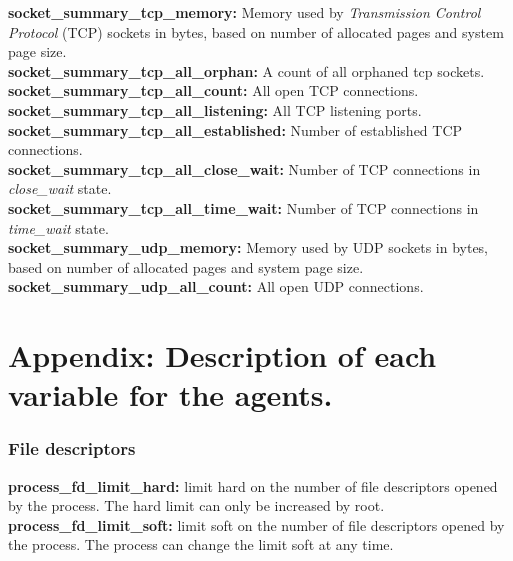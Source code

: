 \documentclass{iosart2c}
\begin{document}
\textbf{socket\_summary\_tcp\_memory:} Memory used by  \textit{Transmission Control Protocol} (TCP) sockets in bytes, based on number of allocated pages and system page size. \\

\textbf{socket\_summary\_tcp\_all\_orphan:} A count of all orphaned tcp sockets.\\

\textbf{socket\_summary\_tcp\_all\_count:} All open TCP connections.\\

\textbf{socket\_summary\_tcp\_all\_listening:} All TCP listening ports.\\

\textbf{socket\_summary\_tcp\_all\_established:} Number of established TCP connections.\\

\textbf{socket\_summary\_tcp\_all\_close\_wait:} Number of TCP connections in \textit{close\_wait} state.\\

\textbf{socket\_summary\_tcp\_all\_time\_wait:} Number of TCP connections in \textit{time\_wait} state.\\

\textbf{socket\_summary\_udp\_memory:} Memory used by UDP sockets in bytes, based on number of allocated pages and system page size.\\

\textbf{socket\_summary\_udp\_all\_count:} All open UDP connections.\\



\section{Appendix: Description of each variable for the agents.}


\subsubsection{File descriptors}

\textbf{process\_fd\_limit\_hard:} limit hard on the number of file descriptors opened by the process. The hard limit can only be increased by root.\\

\textbf{process\_fd\_limit\_soft:} limit soft on the number of file descriptors opened by the process. The process can change the limit soft at any time.\\
\end{document}
